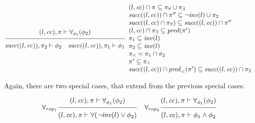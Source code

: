 \documentclass{article}
\newcommand{\proofrule}[3][]{#1 \frac{\raisebox{.7ex}{\normalsize{$#2$}}}
  {\raisebox{-1.0ex}{\normalsize{$#3$}}}}
\newcommand{\placeholder}[1][]{\pi_{#1}}
\newcommand{\loc}{l}
\newcommand{\region}{\mathit{cc}}
\newcommand{\suc}{\mathit{succ}}
\newcommand{\pre}{\mathit{pred}}
\newcommand{\inv}{\mathit{inv}}
\begin{document}
\[
\proofrule
{(\loc, \region), \placeholder \vdash \forall_{\phi_1}(\phi_2)}
{
  \suc((\loc, \region)), \placeholder[2] \vdash \phi_2
  \quad \suc((\loc, \region)), \placeholder[1] \vdash \phi_1
}
\begin{array}{l}
  (\loc, \region) \cap \placeholder \subseteq \placeholder[\forall] \cup \placeholder[\exists] \\
  \suc((\loc, \region)) \cap \placeholder'' \subseteq \lnot \inv(\loc) \cup \placeholder[2]\\
  \suc((\loc, \region) \cap \placeholder[\forall]) \subseteq \suc((\loc, \region)) \cap \placeholder'' \\
  (\loc, \region) \cap \placeholder[\exists] \subseteq \pre(\placeholder') \\
  \placeholder[1] \subseteq \inv(\loc) \\
  \placeholder[2] \subseteq \inv(\loc) \\
  \placeholder[\land] = \placeholder[1] \cap \placeholder[2] \\
  \placeholder' \subseteq \placeholder[\land] \\
  \suc((\loc, \region)) \cap \pre_{<}(\placeholder') \subseteq \suc((\loc, \region)) \cap \placeholder[2]
\end{array}
\]

Again, there are two special cases, that extend from the previous special cases.

\[
\proofrule[\forall_{rop_1}]
{(\loc, \region), \placeholder \vdash \forall_{\phi_1}(\phi_2)}
{(\loc, \region), \placeholder \vdash \forall(\lnot \inv(\loc) \lor \phi_2)}
%
\quad
%
\proofrule[\forall_{rop_2}]
{(\loc, \region), \placeholder \vdash \forall_{\phi_1}(\phi_2)}
{(\loc, \region), \placeholder \vdash \phi_1 \land \phi_2}
\]
\end{document}
